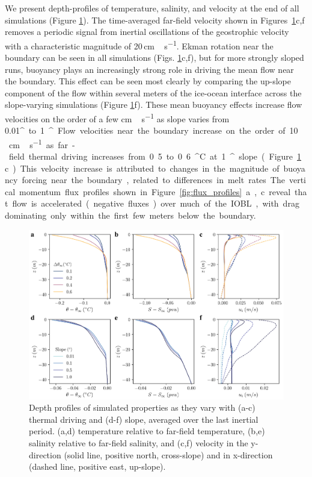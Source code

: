\documentclass[tc, manuscript]{copernicus}
\begin{document}
We present depth-profiles of temperature, salinity, and velocity at the end of all simulations (Figure \ref{fig:dT_profiles}). The time-averaged far-field velocity shown in Figures~\ref{fig:dT_profiles}c,f removes a periodic signal from inertial oscillations of the geostrophic velocity with a characteristic magnitude of 20\,\unit{cm\,s^{-1}}. Ekman rotation near the boundary can be seen in all simulations (Figs. \ref{fig:dT_profiles}c,f), but for more strongly sloped runs, buoyancy plays an increasingly strong role in driving the mean flow near the boundary. This effect can be seen most clearly by comparing the up-slope component of the flow within several meters of the ice-ocean interface across the slope-varying simulations (Figure \ref{fig:dT_profiles}f). These mean buoyancy effects increase flow velocities on the order of a few \unit{cm\,s^{-1}} as slope varies from 0.01\unit{^{\circ}} to 1\unit{^{\circ}}. Flow velocities near the boundary increase on the order of 10\,\unit{cm\,s^{-1}} as far-field thermal driving increases from 0.5 to 0.6\unit{^{\circ}C} at 1\unit{^{\circ}} slope (Figure \ref{fig:dT_profiles}c). This velocity increase is attributed to changes in the magnitude of buoyancy forcing near the boundary, related to differences in melt rates. The vertical momentum flux profiles shown in Figure~\ref{fig:flux_profiles}a,c reveal that flow is accelerated (negative fluxes) over much of the IOBL, with drag dominating only within the first few meters below the boundary.
 

\begin{figure}[t]
\includegraphics[width=12cm]{fig2.pdf}
\caption{Depth profiles of simulated properties as they vary with (a-c) thermal driving and (d-f) slope, averaged over the last inertial period. (a,d) temperature relative to far-field temperature, (b,e) salinity relative to far-field salinity, and (c,f) velocity in the y-direction (solid line, positive north, cross-slope) and in x-direction (dashed line, positive east, up-slope). }
\label{fig:dT_profiles}
\end{figure}
\end{document}
